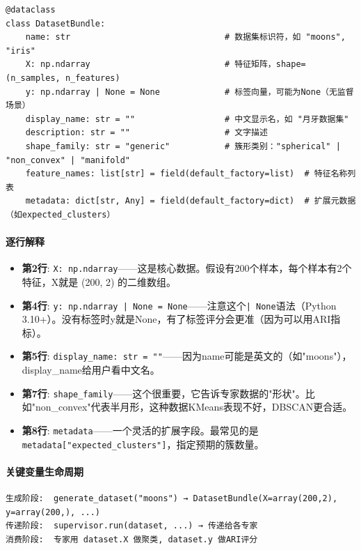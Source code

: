 \documentclass[11pt,a4paper]{ctexbook}
\begin{document}
\begin{verbatim}
@dataclass
class DatasetBundle:
    name: str                               # 数据集标识符，如 "moons", "iris"
    X: np.ndarray                           # 特征矩阵，shape=(n_samples, n_features)
    y: np.ndarray | None = None             # 标签向量，可能为None（无监督场景）
    display_name: str = ""                  # 中文显示名，如 "月牙数据集"
    description: str = ""                   # 文字描述
    shape_family: str = "generic"           # 簇形类别："spherical" | "non_convex" | "manifold"
    feature_names: list[str] = field(default_factory=list)  # 特征名称列表
    metadata: dict[str, Any] = field(default_factory=dict)  # 扩展元数据（如expected_clusters）
\end{verbatim}

\paragraph{逐行解释}
\begin{itemize}
    \item \textbf{第2行}: \texttt{X: np.ndarray}——这是核心数据。假设有200个样本，每个样本有2个特征，X就是 (200, 2) 的二维数组。
    \item \textbf{第4行}: \texttt{y: np.ndarray | None = None}——注意这个\texttt{| None}语法（Python 3.10+）。没有标签时y就是None，有了标签评分会更准（因为可以用ARI指标）。
    \item \textbf{第5行}: \texttt{display\_name: str = ""}——因为name可能是英文的（如"moons"），display\_name给用户看中文名。
    \item \textbf{第7行}: \texttt{shape\_family}——这个很重要，它告诉专家数据的"形状"。比如"non\_convex"代表半月形，这种数据KMeans表现不好，DBSCAN更合适。
    \item \textbf{第8行}: \texttt{metadata}——一个灵活的扩展字段。最常见的是\verb|metadata["expected_clusters"]|，指定预期的簇数量。
\end{itemize}

\paragraph{关键变量生命周期}
\begin{verbatim}
生成阶段:  generate_dataset("moons") → DatasetBundle(X=array(200,2), y=array(200,), ...)
传递阶段:  supervisor.run(dataset, ...) → 传递给各专家
消费阶段:  专家用 dataset.X 做聚类, dataset.y 做ARI评分
\end{verbatim}
\end{document}
